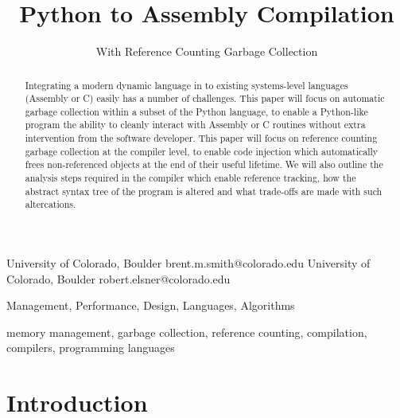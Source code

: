 \documentclass{sigplanconf}
\begin{document}
\copyrightdata{[to be supplied]} 


\title{Python to Assembly Compilation}
\subtitle{With Reference Counting Garbage Collection}

           {University of Colorado, Boulder}
           {brent.m.smith@colorado.edu}
           {University of Colorado, Boulder}
           {robert.elsner@colorado.edu}

\maketitle

\begin{abstract}
Integrating a modern dynamic language in to existing systems-level languages (Assembly or C) easily has a number of challenges.  This paper will focus on automatic garbage collection within a subset of the Python language, to enable a Python-like program the ability to cleanly interact with Assembly or C routines without extra intervention from the software developer.  This paper will focus on reference counting garbage collection at the compiler level, to enable code injection which automatically frees non-referenced objects at the end of their useful lifetime.  We will also outline the analysis steps required in the compiler which enable reference tracking, how the abstract syntax tree of the program is altered and what trade-offs are made with such altercations.
\end{abstract}


\terms
Management, Performance, Design, Languages, Algorithms

\keywords
memory management, garbage collection, reference counting, compilation, compilers, programming languages

\section{Introduction}
\end{document}
